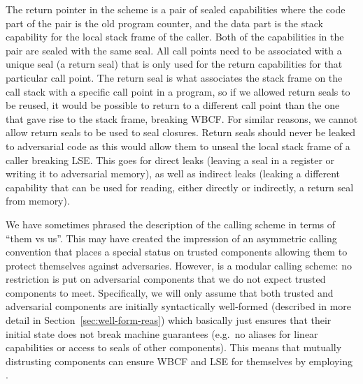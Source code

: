 \documentclass[acmsmall,screen]{acmart}\settopmatter{}
\begin{document}
The return pointer in the \stktokens{} scheme is a pair of sealed capabilities where the code part of the pair is the old program counter, and the data part is the stack capability for the local stack frame of the caller.
Both of the capabilities in the pair are sealed with the same seal.
All call points need to be associated with a unique seal (a return seal) that is only used for the return capabilities for that particular call point.
The return seal is what associates the stack frame on the call stack with a specific call point in a program, so if we allowed return seals to be reused, it would be possible to return to a different call point than the one that gave rise to the stack frame, breaking WBCF.
For similar reasons, we cannot allow return seals to be used to seal closures.
Return seals should never be leaked to adversarial code as this would allow them to unseal the local stack frame of a caller breaking LSE.
This goes for direct leaks (leaving a seal in a register or writing it to adversarial memory), as well as indirect leaks (leaking a different capability that can be used for reading, either directly or indirectly, a return seal from memory).

We have sometimes phrased the description of the \stktokens{} calling scheme in terms of ``them vs us''.
This may have created the impression of an asymmetric calling convention that places a special status on trusted components allowing them to protect themselves against adversaries.
However, \stktokens{} is a modular calling scheme: no restriction is put on adversarial components that we do not expect trusted components to meet.
Specifically, we will only assume that both trusted and adversarial components are initially syntactically well-formed (described in more detail in Section~\ref{sec:well-form-reas}) which basically just ensures that their initial state does not break machine guarantees (e.g.\ no aliases for linear capabilities or access to seals of other components).
This means that mutually distrusting components can ensure WBCF and LSE for themselves by employing \stktokens{}.

\end{document}
